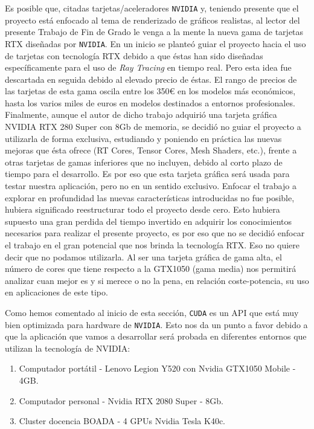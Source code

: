 \documentclass[titlepage,12pt]{report}
\begin{document}
Es posible que, citadas tarjetas/aceleradores \texttt{NVIDIA} y, teniendo presente que el proyecto está enfocado al tema de renderizado de gráficos realistas, al lector del presente Trabajo de Fin de Grado le venga a la mente la nueva gama de tarjetas RTX diseñadas por \texttt{NVIDIA}. En un inicio se planteó guiar el proyecto hacia el uso de tarjetas con tecnología RTX debido a que éstas han sido diseñadas específicamente para el uso de \textit{Ray Tracing} en tiempo real. Pero esta idea fue descartada en seguida debido al elevado precio de éstas. El rango de precios de las tarjetas de esta gama oscila entre los 350€ en los modelos más económicos, hasta los varios miles de euros en modelos destinados a entornos profesionales. Finalmente, aunque el autor de dicho trabajo adquirió una tarjeta gráfica NVIDIA RTX 280 Super con 8Gb de memoria, se decidió no guiar el proyecto a utilizarla de forma exclusiva, estudiando y poniendo en práctica las nuevas mejoras que ésta ofrece (RT Cores, Tensor Cores, Mesh Shaders, etc.), frente a otras tarjetas de gamas inferiores que no incluyen, debido al corto plazo de tiempo para el desarrollo. Es por eso que esta tarjeta gráfica será usada para testar nuestra aplicación, pero no en un sentido exclusivo. Enfocar el trabajo a explorar en profundidad las nuevas características introducidas no fue posible, hubiera significado reestructurar todo el proyecto desde cero. Esto hubiera supuesto una gran perdida del tiempo invertido en adquirir los conocimientos necesarios para realizar el presente proyecto, es por eso que no se decidió enfocar el trabajo en el gran potencial que nos brinda la tecnología RTX. Eso no quiere decir que no podamos utilizarla. Al ser una tarjeta gráfica de gama alta, el número de cores que tiene respecto a la GTX1050 (gama media) nos permitirá analizar cuan mejor es y si merece o no la pena, en relación coste-potencia, su uso en aplicaciones de este tipo.

Como hemos comentado al inicio de esta sección, \texttt{CUDA} es un API que está muy bien optimizada para hardware de \texttt{NVIDIA}. Esto nos da un punto a favor debido a que la aplicación que vamos a desarrollar será probada en diferentes entornos que utilizan la tecnología de NVIDIA:

\begin{enumerate}
	\item Computador portátil - Lenovo Legion Y520 con Nvidia GTX1050 Mobile - 4GB.
	\item Computador personal - Nvidia RTX 2080 Super - 8Gb.
	\item Cluster docencia BOADA - 4 GPUs Nvidia Tesla K40c.
\end{enumerate}
\end{document}
